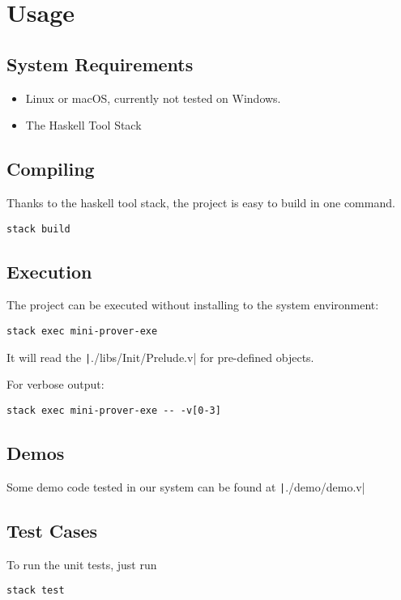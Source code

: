 \section{Usage}

\subsection{System Requirements}
\begin{itemize}
    \item Linux or macOS, currently not tested on Windows.
    \item The Haskell Tool Stack
\end{itemize}

\subsection{Compiling}
Thanks to the haskell tool stack, the project is easy to build in one command.
\begin{center}
\begin{minipage}{0.6\textwidth}
\begin{verbatim}
stack build      
\end{verbatim}
\end{minipage}
\end{center}

\subsection{Execution}
The project can be executed without installing to the system environment:
\begin{center}
\begin{minipage}{0.6\textwidth}
\begin{verbatim}
stack exec mini-prover-exe
\end{verbatim}
\end{minipage}
\end{center}
It will read the \texttt|./libs/Init/Prelude.v| for pre-defined objects.

For verbose output:
\begin{center}
\begin{minipage}{0.6\textwidth}
\begin{verbatim}
stack exec mini-prover-exe -- -v[0-3]
\end{verbatim}
\end{minipage}
\end{center}

\subsection{Demos}
Some demo code tested in our system can be found at \texttt|./demo/demo.v|

\subsection{Test Cases}
To run the unit tests, just run
\begin{center}
\begin{minipage}{0.6\textwidth}
\begin{verbatim}
stack test
\end{verbatim}
\end{minipage}
\end{center}


